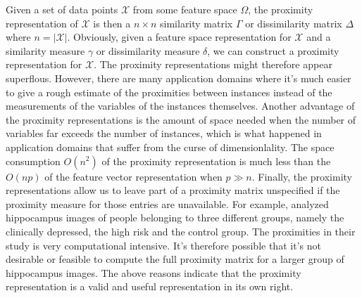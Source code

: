 %
%
\noindent
Given a set of data points $\mathcal{X}$ from some feature space
$\Omega$, the proximity representation of $\mathcal{X}$ is then a $n
\times n$ similarity matrix $\Gamma$ or dissimilarity matrix $\Delta$
where $n = | \mathcal{X}|$. Obviously, given a feature space
representation for $\mathcal{X}$ and a similarity measure $\gamma$ or
dissimilarity measure $\delta$, we can construct a proximity
representation for $\mathcal{X}$. The proximity representations might
therefore appear superflous. However, there are many application
domains where it's much easier to give a rough estimate of the
proximities between instances instead of the measurements of the
variables of the instances themselves. Another advantage of the
proximity representations is the amount of space needed when the
number of variables far exceeds the number of instances, which is what
happened in application domains that suffer from the curse of
dimensionlality. The space consumption $O(n^2)$ of the proximity
representation is much less than the $O(np)$ of the feature vector
representation when $p \gg n$. Finally, the proximity representations
allow us to leave part of a proximity matrix unspecified if the
proximity measure for those entries are unavailable. For example,
\citet{park07:_hippoc} analyzed hippocampus images of people belonging
to three different groups, namely the clinically depressed, the high
risk and the control group. The proximities in their study is very
computational intensive. It's therefore possible that it's not
desirable or feasible to compute the full proximity matrix for a
larger group of hippocampus images. The above
reasons indicate that the proximity representation is a valid and
useful representation in its own right.
